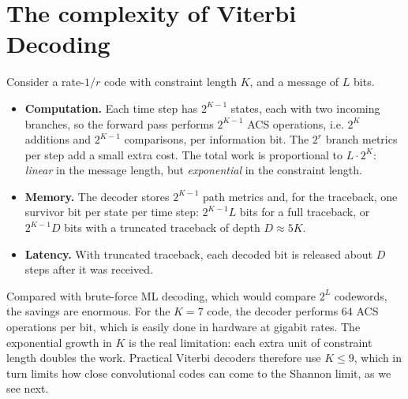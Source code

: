 \section{The complexity of Viterbi Decoding}\label{sec:complexity}
Consider a rate-\(1/r\) code with constraint length \(K\), and a message of \(L\) bits.
\begin{itemize}
    \item \textbf{Computation.} Each time step has \(2^{K-1}\) states, each with two incoming branches, so the forward pass performs \(2^{K-1}\) ACS operations, i.e. \(2^K\) additions and \(2^{K-1}\) comparisons, per information bit. The \(2^r\) branch metrics per step add a small extra cost. The total work is proportional to \(L \cdot 2^K\): \emph{linear} in the message length, but \emph{exponential} in the constraint length.
    \item \textbf{Memory.} The decoder stores \(2^{K-1}\) path metrics and, for the traceback, one survivor bit per state per time step: \(2^{K-1} L\) bits for a full traceback, or \(2^{K-1} D\) bits with a truncated traceback of depth \(D \approx 5K\).
    \item \textbf{Latency.} With truncated traceback, each decoded bit is released about \(D\) steps after it was received.
\end{itemize}
Compared with brute-force ML decoding, which would compare \(2^L\) codewords, the savings are enormous. For the \(K=7\) code, the decoder performs \(64\) ACS operations per bit, which is easily done in hardware at gigabit rates. The exponential growth in \(K\) is the real limitation: each extra unit of constraint length doubles the work. Practical Viterbi decoders therefore use \(K \leq 9\), which in turn limits how close convolutional codes can come to the Shannon limit, as we see next.


